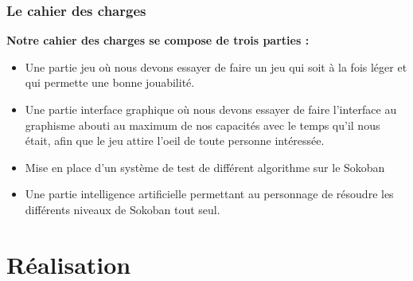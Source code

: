 \documentclass[a4paper,12pt]{article} %
\begin{document}
\subsubsection{Le cahier des charges}
\noindent
\textbf{Notre cahier des charges se compose de trois parties :}
\newline
\begin{itemize}
\item Une partie jeu où nous devons essayer de faire un jeu qui soit à la fois léger et qui permette une bonne jouabilité.
\item Une partie interface graphique où nous devons essayer de faire l’interface au graphisme abouti au maximum de nos capacités avec le temps qu'il nous était, afin que le jeu attire l’oeil de toute personne intéressée.
\item Mise en place d'un système de test de différent algorithme sur le Sokoban
\item Une partie intelligence artificielle permettant au personnage de résoudre les différents niveaux de Sokoban tout seul.
\newline
\end{itemize} 


\newpage
\section{Réalisation}
\end{document}
